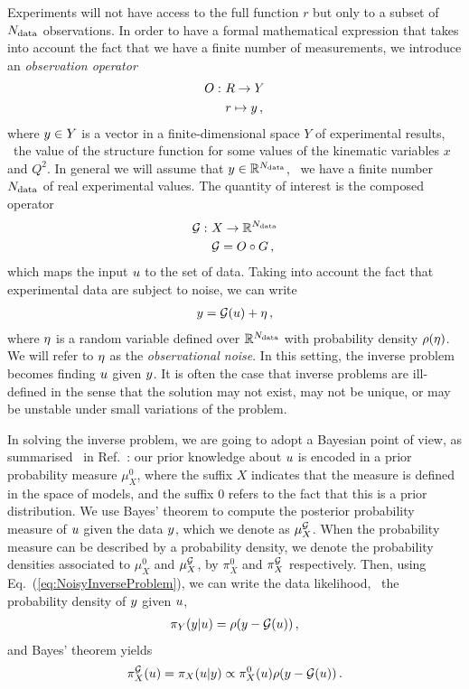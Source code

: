 Experiments will not have access to the full function $r$ but only to a subset
of $N_{\rm data}$ observations. In order to have a formal mathematical expression that
takes into account the fact that we have a finite number of measurements, we
introduce an {\em observation operator}
\begin{align}
  O : ~& R \to Y \nonumber \\
       & r \mapsto y \, ,
\end{align}
where $y \in Y$ is a vector in a finite-dimensional space $Y$ of experimental
results, \eg\ the value of the structure function for some values of the
kinematic variables $x$ and $Q^2$. In general we will assume that $y \in
\mathbb{R}^{N_{\rm data}}$, \ie\ we have a finite number $N_{\rm data}$ of real experimental
values. The quantity of interest is the composed operator
\begin{align}
  \mathcal{G} : ~& X \to \mathbb{R}^{N_{\rm data}} \nonumber \\
                 & \mathcal{G} = O \circ G\, ,
\end{align}
which maps the input $u$ to the set of data. Taking into account the
fact that experimental data are subject to noise, we can write
\begin{align}
  \label{eq:NoisyInverseProblem}
  y = \mathcal{G}(u) + \eta\, ,
\end{align}
where $\eta$ is a random variable defined over $\mathbb{R}^{N_{\rm data}}$ with
probability density $\rho(\eta)$. We will refer to $\eta$ as the {\em
observational noise}. In this setting, the inverse problem becomes finding
$u$ given $y$. It is often the case that inverse problems are
ill-defined in the sense that the solution may not exist, may not be unique, or
may be unstable under small variations of the problem. 

In solving the inverse problem, we are going to adopt a Bayesian point of view,
as summarised \eg\ in Ref.~\cite{Stuart:2010}: our prior knowledge about
$u$ is encoded in a prior probability measure $\mu_X^0$, where the
suffix $X$ indicates that the measure is defined in the space of models, and the
suffix 0 refers to the fact that this is a prior distribution. We use Bayes'
theorem to compute the posterior probability measure of $u$ given the
data $y$, which we denote as $\mu_X^{\mathcal{G}}$. When the probability measure
can be described by a probability density, we denote the probability densities
associated to $\mu_X^0$ and $\mu_X^{\mathcal{G}}$, by $\pi_X^0$ and
$\pi_X^{\mathcal{G}}$ respectively. Then, using Eq.~(\ref{eq:NoisyInverseProblem}),
we can write the data likelihood, \ie\ the probability density of $y$ given
$u$,
\begin{align}
  \label{eq:YGivenUProbDensity}
  \pi_Y(y|u) = \rho(y-\mathcal{G}(u))\, ,
\end{align}
and Bayes' theorem yields
\begin{align}
  \label{eq:BayesThmInversePosterior}
  \pi_X^{\mathcal{G}}(u) = \pi_X(u|y) \propto 
  \pi_X^0(u)
  \rho(y-\mathcal{G}(u))\, .
\end{align}

